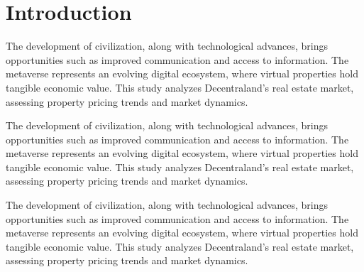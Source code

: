 \section{Introduction}
The development of civilization, along with technological advances, brings opportunities such as improved communication and access to information. The metaverse represents an evolving digital ecosystem, where virtual properties hold tangible economic value. This study analyzes Decentraland’s real estate market, assessing property pricing trends and market dynamics.

The development of civilization, along with technological advances, brings opportunities such as improved communication and access to information. The metaverse represents an evolving digital ecosystem, where virtual properties hold tangible economic value. This study analyzes Decentraland’s real estate market, assessing property pricing trends and market dynamics.

The development of civilization, along with technological advances, brings opportunities such as improved communication and access to information. The metaverse represents an evolving digital ecosystem, where virtual properties hold tangible economic value. This study analyzes Decentraland’s real estate market, assessing property pricing trends and market dynamics.